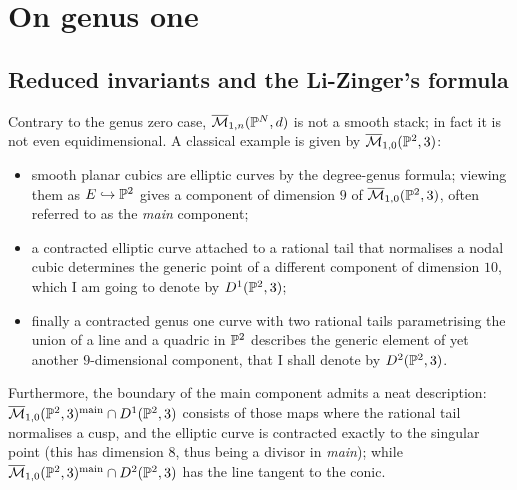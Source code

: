 \chapter{On genus one}

\section{Reduced invariants and the Li-Zinger's formula}
Contrary to the genus zero case, $\overline{\mathcal{M}}_{1,n}(\mathbb P^N,d)$ is not a smooth stack; in fact it is not even equidimensional. A classical example is given by $\overline{\mathcal{M}}_{1,0}(\mathbb P^2,3)$:
\begin{itemize}
 \item smooth planar cubics are elliptic curves by the degree-genus formula; viewing them as $E\hookrightarrow \mathbb P^2$ gives a component of dimension $9$ of $\overline{\mathcal{M}}_{1,0}(\mathbb P^2,3)$, often referred to as the \emph{main} component;
 \item a contracted elliptic curve attached to a rational tail that normalises a nodal cubic determines the generic point of a different component of dimension $10$, which I am going to denote by $D^1(\mathbb P^2,3)$;
 \item finally a contracted genus one curve with two rational tails parametrising the union of a line and a quadric in $\mathbb P^2$ describes the generic element of yet another $9$-dimensional component, that I shall denote by $D^2(\mathbb P^2,3)$.
\end{itemize}
Furthermore, the boundary of the main component admits a neat description: $\overline{\mathcal{M}}_{1,0}(\mathbb P^2,3)^{\mathrm{main}}\cap D^1(\mathbb P^2,3)$ consists of those maps where the rational tail normalises a cusp, and the elliptic curve is contracted exactly to the singular point (this has dimension $8$, thus being a divisor in \emph{main}); while $\overline{\mathcal{M}}_{1,0}(\mathbb P^2,3)^{\mathrm{main}}\cap D^2(\mathbb P^2,3)$ has the line tangent to the conic.

